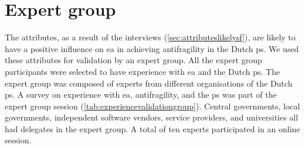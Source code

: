\chapter{Expert group}
\label{ch:expertgroup}
\setcounter{footnote}{0}
The \glspl{attribute}, as a result of the interviews (\cref{sec:attributeslikelysf}), are likely to have a positive influence on \gls{ea} in achieving \gls{antifragility} in the Dutch \gls{ps}. We used these \glspl{attribute} for validation by an expert group. All the expert group participants were selected to have experience with \gls{ea} and the Dutch \gls{ps}. The expert group was composed of experts from different organisations of the Dutch \gls{ps}. A survey on experience with \gls{ea}, \gls{antifragility}, and the \gls{ps} was part of the expert group session (\cref{tab:experiencevalidationgroup}). Central governments, local governments, independent software vendors, service providers, and universities all had delegates in the expert group. A total of ten experts participated in an online session. 
 
